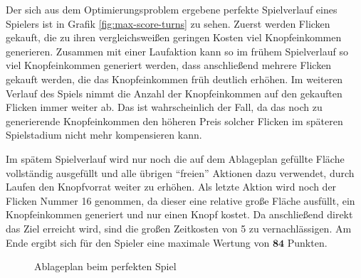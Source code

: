 Der sich aus dem Optimierungsproblem ergebene perfekte Spielverlauf eines Spielers ist in Grafik \ref{fig:max-score-turns} zu sehen. Zuerst werden Flicken gekauft, die zu ihren vergleichsweißen geringen Kosten viel Knopfeinkommen generieren. Zusammen mit einer Laufaktion kann so im frühem Spielverlauf so viel Knopfeinkommen generiert werden, dass anschließend mehrere Flicken gekauft werden, die das Knopfeinkommen früh deutlich erhöhen. Im weiteren Verlauf des Spiels nimmt die Anzahl der Knopfeinkommen auf den gekauften Flicken immer weiter ab. Das ist wahrscheinlich der Fall, da das noch zu generierende Knopfeinkommen den höheren Preis solcher Flicken im späteren Spielstadium nicht mehr kompensieren kann.

Im spätem Spielverlauf wird nur noch die auf dem Ablageplan gefüllte Fläche vollständig ausgefüllt und alle übrigen \enquote{freien} Aktionen dazu verwendet, durch Laufen den Knopfvorrat weiter zu erhöhen. Als letzte Aktion wird noch der Flicken Nummer 16 genommen, da dieser eine relative große Fläche ausfüllt, ein Knopfeinkommen generiert und nur einen Knopf kostet. Da anschließend direkt das Ziel erreicht wird, sind die großen Zeitkosten von 5 zu vernachlässigen. Am Ende ergibt sich für den Spieler eine maximale Wertung von $\boldsymbol{84}$ Punkten.

\begin{figure}
    \vspace*{-0.75cm}
    \centering
    \caption[Ablageplan beim perfekten Spiel]{\unskip}
    Ablageplan beim perfekten Spiel
    \label{fig:max-score-quilt-board}
    \vspace*{-0.75cm}
\end{figure}

